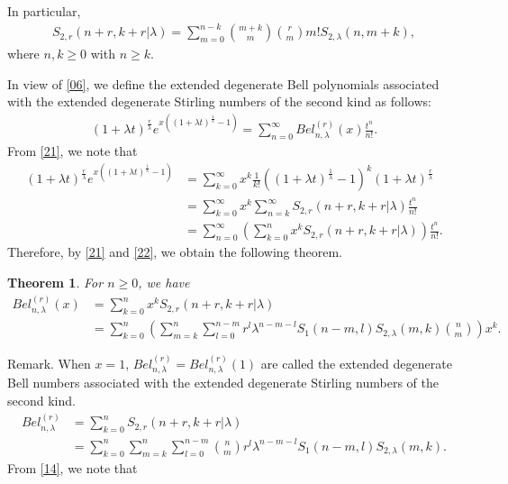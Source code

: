 \documentclass[10pt,twoside,reqno]{amsart}
\numberwithin{equation}{section}
\newtheorem{thm}{\bf Theorem}[section]
\begin{document}
In particular,
\begin{equation*}\begin{split}
S_{2,r}(n+r,k+r|\lambda ) = \sum_{m=0}^{n-k} {m+k \choose m} {r \choose m} m! S_{2,\lambda }(n,m+k),
\end{split}\end{equation*}
where $n,k \geq 0$ with $n \geq k$.

In view of \eqref{06}, we define the extended degenerate Bell polynomials associated with the extended degenerate Stirling numbers of the second kind as follows:
\begin{equation}\begin{split}\label{21}
(1+\lambda t)^{\frac{r}{\lambda }}e^{x((1+\lambda t)^{\frac{1}{\lambda }}-1)} = \sum_{n=0}^\infty Bel_{n,\lambda }^{(r)} (x) \frac{t^n}{n!}.
\end{split}\end{equation}
From \eqref{21}, we note that
\begin{equation}\begin{split}\label{22}
(1+\lambda t)^{\frac{r}{\lambda }}e^{x((1+\lambda t)^{\frac{1}{\lambda }}-1)}&= \sum_{k=0}^\infty x^k \frac{1}{k!} ((1+\lambda t)^{\frac{1}{\lambda }}-1)^k (1+\lambda t)^{\frac{r}{\lambda }} \\
&= \sum_{k=0}^\infty x^k \sum_{n=k}^\infty S_{2,r} (n+r,k+r|\lambda ) \frac{t^n}{n!}\\
&= \sum_{n=0}^\infty \left( \sum_{k=0}^n x^k S_{2,r}(n+r,k+r|\lambda ) \right) \frac{t^n}{n!}.
\end{split}\end{equation}
Therefore, by \eqref{21} and \eqref{22}, we obtain the following theorem.

\begin{thm}
For $n \geq 0$, we have
\begin{equation*}\begin{split}
Bel_{n,\lambda }^{(r)}(x) &= \sum_{k=0}^n x^k S_{2,r}(n+r,k+r|\lambda )\\
&= \sum_{k=0}^n \left( \sum_{m=k}^n \sum_{l=0}^{n-m} r^l \lambda ^{n-m-l} S_1(n-m,l) S_{2,\lambda }(m,k) {n \choose m} \right) x^k.
\end{split}\end{equation*}	
\end{thm}

Remark. When $x=1$, $Bel_{n,\lambda }^{(r)} = Bel_{n,\lambda }^{(r)}(1)$ are called the extended degenerate Bell numbers associated with the extended degenerate Stirling numbers of the second kind.
\begin{equation*}\begin{split}
Bel_{n,\lambda }^{(r)} &= \sum_{k=0}^n S_{2,r} (n+r,k+r|\lambda )\\
&= \sum_{k=0}^n \sum_{m=k}^n \sum_{l=0}^{n-m} {n \choose m} r^l \lambda ^{n-m-l} S_1(n-m,l) S_{2,\lambda }(m,k).
\end{split}\end{equation*}
From \eqref{14}, we note that
\end{document}
